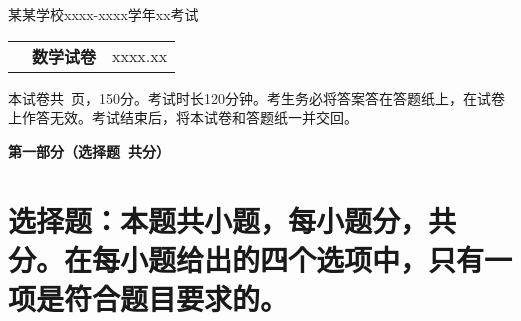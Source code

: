 \documentclass[12pt, a4paper]{article}
\def\mycenter#1{\begin{center} \bf \sffamily \large #1 \end{center}}
\begin{document}
\setmainfont{Times New Roman}

\begin{center}
    \large 某某学校xxxx-xxxx学年xx考试 \\
    \begin{tabular}{@{}p{} c p{}@{}}
        & \Large \bf \sffamily 数学试卷 & \hfill \small xxxx.xx
    \end{tabular}
\end{center}

本试卷共\pageref{LastPage}\ 页，150分。考试时长120分钟。考生务必将答案答在答题纸上，在试卷上作答无效。考试结束后，将本试卷和答题纸一并交回。

\mycenter{第一部分（选择题\ 共\textmd{}分）}

\section{选择题：本题共\textmd{}小题，每小题\textmd{}分，共\textmd{}分。在每小题给出的四个选项中，只有一项是符合题目要求的。}
\end{document}
